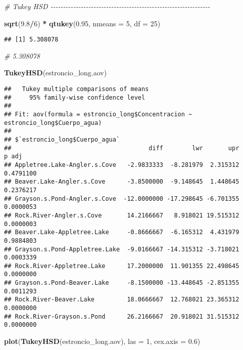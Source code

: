 \documentclass[
]{article}
\newenvironment{Shaded}{\begin{snugshade}}{\end{snugshade}}
\newcommand{\AttributeTok}[1]{\textcolor[rgb]{0.13,0.29,0.53}{#1}}
\newcommand{\CommentTok}[1]{\textcolor[rgb]{0.56,0.35,0.01}{\textit{#1}}}
\newcommand{\DecValTok}[1]{\textcolor[rgb]{0.00,0.00,0.81}{#1}}
\newcommand{\FloatTok}[1]{\textcolor[rgb]{0.00,0.00,0.81}{#1}}
\newcommand{\FunctionTok}[1]{\textcolor[rgb]{0.13,0.29,0.53}{\textbf{#1}}}
\newcommand{\NormalTok}[1]{#1}
\newcommand{\SpecialCharTok}[1]{\textcolor[rgb]{0.81,0.36,0.00}{\textbf{#1}}}
\begin{document}
\begin{Shaded}
\begin{Highlighting}[]
\CommentTok{\# Tukey HSD {-}{-}{-}{-}{-}{-}{-}{-}{-}{-}{-}{-}{-}{-}{-}{-}{-}{-}{-}{-}{-}{-}{-}{-}{-}{-}{-}{-}{-}{-}{-}{-}{-}{-}{-}{-}{-}{-}{-}{-}{-}{-}{-}{-}{-}{-}{-}{-}{-}{-}{-}{-}{-}{-}{-}{-}{-}{-}{-}{-}{-}{-}{-}}

\FunctionTok{sqrt}\NormalTok{(}\FloatTok{9.8}\SpecialCharTok{/}\DecValTok{6}\NormalTok{) }\SpecialCharTok{*} \FunctionTok{qtukey}\NormalTok{(}\FloatTok{0.95}\NormalTok{, }\AttributeTok{nmeans =} \DecValTok{5}\NormalTok{, }\AttributeTok{df =} \DecValTok{25}\NormalTok{)}
\end{Highlighting}
\end{Shaded}

\begin{verbatim}
## [1] 5.308078
\end{verbatim}

\begin{Shaded}
\begin{Highlighting}[]
\CommentTok{\# 5.308078}

\FunctionTok{TukeyHSD}\NormalTok{(estroncio\_long.aov)}
\end{Highlighting}
\end{Shaded}

\begin{verbatim}
##   Tukey multiple comparisons of means
##     95% family-wise confidence level
## 
## Fit: aov(formula = estroncio_long$Concentracion ~ estroncio_long$Cuerpo_agua)
## 
## $`estroncio_long$Cuerpo_agua`
##                                      diff        lwr       upr     p adj
## Appletree.Lake-Angler.s.Cove   -2.9833333  -8.281979  2.315312 0.4791100
## Beaver.Lake-Angler.s.Cove      -3.8500000  -9.148645  1.448645 0.2376217
## Grayson.s.Pond-Angler.s.Cove  -12.0000000 -17.298645 -6.701355 0.0000053
## Rock.River-Angler.s.Cove       14.2166667   8.918021 19.515312 0.0000003
## Beaver.Lake-Appletree.Lake     -0.8666667  -6.165312  4.431979 0.9884803
## Grayson.s.Pond-Appletree.Lake  -9.0166667 -14.315312 -3.718021 0.0003339
## Rock.River-Appletree.Lake      17.2000000  11.901355 22.498645 0.0000000
## Grayson.s.Pond-Beaver.Lake     -8.1500000 -13.448645 -2.851355 0.0011293
## Rock.River-Beaver.Lake         18.0666667  12.768021 23.365312 0.0000000
## Rock.River-Grayson.s.Pond      26.2166667  20.918021 31.515312 0.0000000
\end{verbatim}

\begin{Shaded}
\begin{Highlighting}[]
\FunctionTok{plot}\NormalTok{(}\FunctionTok{TukeyHSD}\NormalTok{(estroncio\_long.aov), }\AttributeTok{las =} \DecValTok{1}\NormalTok{, }\AttributeTok{cex.axis =} \FloatTok{0.6}\NormalTok{)}
\end{Highlighting}
\end{Shaded}
\end{document}
